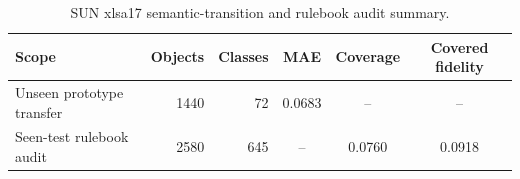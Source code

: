 \begin{table}[H]
\caption{SUN xlsa17 semantic-transition and rulebook audit summary.\label{tab:sun_summary_dataset_local}}
\centering
\small
\begin{tabular}{lrrccc}
\toprule
Scope & Objects & Classes & MAE & Coverage & Covered fidelity \\
\midrule
Unseen prototype transfer & 1440 & 72 & 0.0683 & -- & -- \\
Seen-test rulebook audit & 2580 & 645 & -- & 0.0760 & 0.0918 \\
\bottomrule
\end{tabular}
\end{table}
